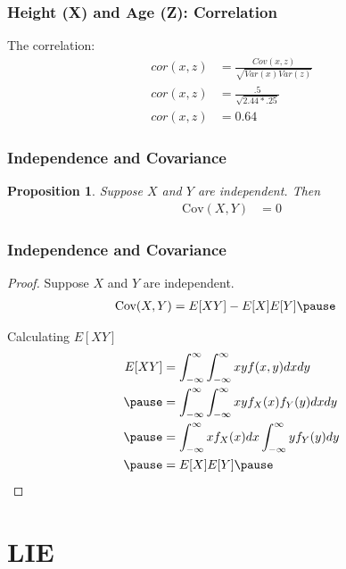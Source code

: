 \documentclass[aspectratio=169, handout]{beamer}
\newtheorem{prop}{Proposition}
\numberwithin{equation}{section}
\begin{document}
\begin{frame}
\frametitle{Height (X) and Age (Z): Correlation}
The correlation:
\begin{align*}
cor(x,z)&=\frac{Cov(x,z)}{\sqrt{Var(x)Var(z)}}\\
cor(x,z)&=\frac{.5}{\sqrt{2.44*.25}}\\
cor(x,z)&=0.64
\end{align*}
\end{frame}


\begin{frame}
\frametitle{Independence and Covariance}

\begin{prop}
Suppose $X$ and $Y$ are independent.  Then 
\begin{align*}
\text{Cov}(X, Y) &= 0  
\end{align*}

\end{prop}

\end{frame}


\begin{frame}
\frametitle{Independence and Covariance}
\begin{small}
\begin{proof}
Suppose $X$ and $Y$ are independent.  \pause 
\begin{align*}
\text{Cov}(X, Y) &= E[XY] - E[X]E[Y]   \pause 
\end{align*}

Calculating $E[XY]$ \pause 
\begin{align*}
E[XY] &= \int_{-\infty}^{\infty} \int_{-\infty}^{\infty} x y f(x,y)dxdy  \\ \pause 
& = \int_{-\infty}^{\infty} \int_{-\infty}^{\infty} x y f_{X}(x) f_{Y}(y)dxdy  \\ \pause 
&= \int_{-\infty}^{\infty} x f_{X}(x) dx \int_{-\infty}^{\infty} y f_{Y}(y) dy  \\ \pause 
&= E[X] E[Y]  \pause 
\end{align*}


\end{proof}

\end{small}
\end{frame}


\section{LIE}
\end{document}
